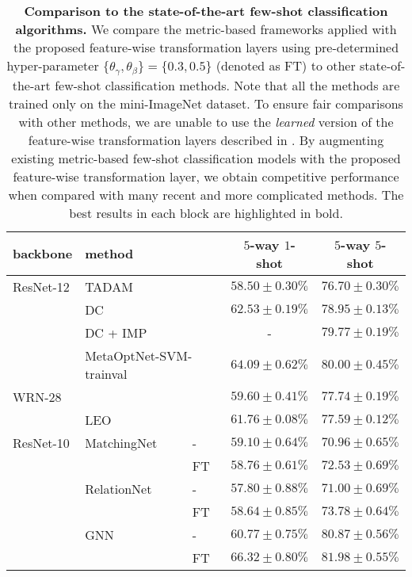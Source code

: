 \begin{table}[t]\footnotesize
	\centering
	\caption{\textbf{Comparison to the state-of-the-art few-shot classification algorithms.} We compare the metric-based frameworks applied with the proposed feature-wise transformation layers using pre-determined hyper-parameter $\{\theta_\gamma, \theta_\beta\} = \{0.3, 0.5\}$ (denoted as FT) to other state-of-the-art few-shot classification methods. Note that all the methods are trained only on the mini-ImageNet dataset. To ensure fair comparisons with other methods, we are unable to use the \emph{learned} version of the feature-wise transformation layers described in . By augmenting existing metric-based few-shot classification models with the proposed feature-wise transformation layer, we obtain competitive performance when compared with many recent and more complicated methods. The best results in each block are highlighted in bold.}
	\begin{tabular}{ll l cc} 
	    \toprule
	    backbone & method &  & $5$-way $1$-shot & $5$-way $5$-shot \\
	    \midrule
	    ResNet-12 & \multicolumn{2}{l}{TADAM~\citep{oreshkin2018tadam}} & $58.50 \pm 0.30\%$ & $76.70 \pm 0.30\%$ \\
	    & \multicolumn{2}{l}{DC~\citep{lifchitz2019dense}} & $62.53 \pm 0.19\%$ & $78.95 \pm 0.13\%$ \\
	    & \multicolumn{2}{l}{DC + IMP~\citep{lifchitz2019dense}} & - & $79.77 \pm 0.19\%$ \\
	    & \multicolumn{2}{l}{MetaOptNet-SVM-trainval~\citep{lee2019rr}} & $\mathbf{64.09 \pm 0.62\%}$ & $\mathbf{80.00 \pm 0.45\%}$ \\
	    WRN-28 & \multicolumn{2}{l}{\citet{qiao2018few}} & $59.60 \pm 0.41\%$ & $77.74 \pm 0.19\%$ \\
	    & \multicolumn{2}{l}{LEO~\citep{rusu2018leo}} & $61.76 \pm 0.08\%$ & $77.59 \pm 0.12\%$ \\
	    \midrule
	    ResNet-10 & MatchingNet & - & $59.10 \pm 0.64\%$ & $70.96 \pm 0.65\%$ \\
		& & FT & $58.76 \pm 0.61\%$ & $72.53 \pm 0.69\%$ \\
		& RelationNet & - & $57.80 \pm 0.88\%$ & $71.00 \pm 0.69\%$ \\
		& & FT & $58.64 \pm 0.85\%$ & $73.78 \pm 0.64\%$ \\
		& GNN & - & $60.77 \pm 0.75\%$ & $80.87 \pm 0.56\%$ \\
		& & FT & $\mathbf{66.32 \pm 0.80\%}$ & $\mathbf{81.98 \pm 0.55\%}$ \\
		\bottomrule 
	\end{tabular}
	\label{tab:sota}
\end{table}

